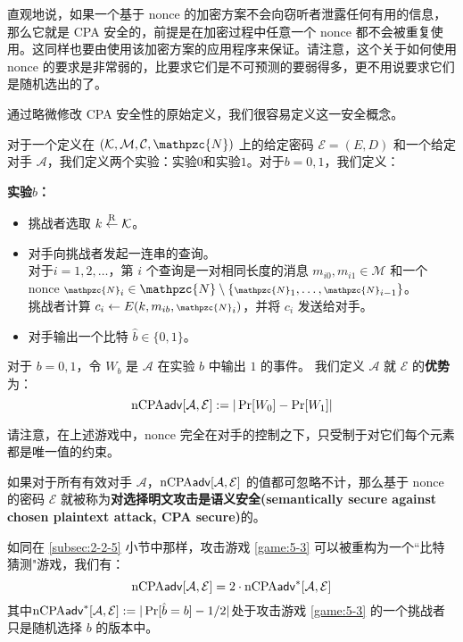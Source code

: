 直观地说，如果一个基于 nonce 的加密方案不会向窃听者泄露任何有用的信息，那么它就是 CPA 安全的，前提是在加密过程中任意一个 nonce 都不会被重复使用。这同样也要由使用该加密方案的应用程序来保证。请注意，这个关于如何使用 nonce 的要求是非常弱的，比要求它们是不可预测的要弱得多，更不用说要求它们是随机选出的了。

通过略微修改 CPA 安全性的原始定义，我们很容易定义这一安全概念。

\begin{game}\label{game:5-3}
对于一个定义在 $(\mathcal{K},\mathcal{M},\mathcal{C},\mathpzc{N})$ 上的给定密码 $\mathcal{E}=(E,D)$ 和一个给定对手 $\mathcal{A}$，我们定义两个实验：实验$0$和实验$1$。对于$b=0,1$，我们定义：

\noindent\textbf{实验$b$：}
\begin{itemize}
	\item 挑战者选取 $k\overset{\rm R}\leftarrow\mathcal{K}$。
	\item 对手向挑战者发起一连串的查询。\\
	对于$i = 1,2,\dots$，第 $i$ 个查询是一对相同长度的消息 $m_{i0},m_{i1}\in\mathcal{M}$ 和一个 nonce ${\scriptstyle\mathpzc{N}}_i\in\mathpzc{N}\setminus\{{\scriptstyle\mathpzc{N}}_1,\dots,{\scriptstyle\mathpzc{N}}_{i-1}\}$。\\
	挑战者计算 $c_i\leftarrow E(k,m_{ib},{\scriptstyle\mathpzc{N}}_i)$，并将 $c_i$ 发送给对手。
	\item 对手输出一个比特 $\hat{b}\in\{0,1\}$。
\end{itemize}

对于 $b=0,1$，令 $W_b$ 是 $\mathcal{A}$ 在实验 $b$ 中输出 $1$ 的事件。 我们定义 $\mathcal{A}$ 就 $\mathcal{E}$ 的\textbf{优势}为：
\[
{\rm nCPA}\mathsf{adv}[\mathcal{A},\mathcal{E}]:=|\Pr[W_0]-\Pr[W_1]|
\]
\end{game}

请注意，在上述游戏中，nonce 完全在对手的控制之下，只受制于对它们每个元素都是唯一值的约束。

\begin{definition}\label{def:5-3}
如果对于所有有效对手 $\mathcal{A}$，${\rm nCPA}\mathsf{adv}[\mathcal{A},\mathcal{E}]$ 的值都可忽略不计，那么基于 nonce 的密码 $\mathcal{E}$ 就被称为\textbf{对选择明文攻击是语义安全(semantically secure against chosen plaintext attack, CPA secure)}的。
\end{definition}

如同在 \ref{subsec:2-2-5} 小节中那样，攻击游戏 \ref{game:5-3} 可以被重构为一个``比特猜测"游戏，我们有：
\begin{equation}\label{eq:5-30}
{\rm nCPA}\mathsf{adv}[\mathcal{A},\mathcal{E}]= 2\cdot{\rm nCPA}\mathsf{adv}^*[\mathcal{A},\mathcal{E}]
\end{equation}
其中${\rm nCPA}\mathsf{adv}^*[\mathcal{A},\mathcal{E}]:=|\Pr[\hat{b}=b]-{1}/{2}|$处于攻击游戏 \ref{game:5-3} 的一个挑战者只是随机选择 $b$ 的版本中。

